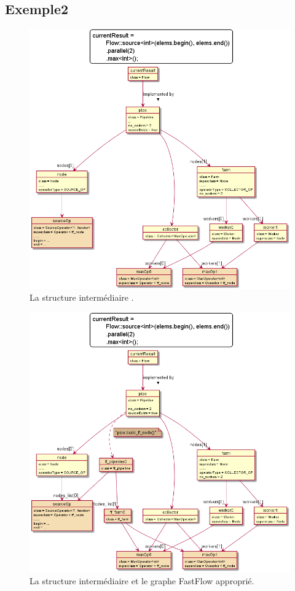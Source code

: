  
\subsection{Exemple2}

\begin{figure}
\centering
         \includegraphics[width=1.0\textwidth]{Figures/objets2-ppff.png}
      \caption{La structure interm\'ediaire .}
       \label{objets2-ppff.fig}
\end{figure}

\begin{figure}
\centering
         \includegraphics[width=1.0\textwidth]{Figures/objets2-ff.png}
      \caption{La structure interm\'ediaire  et le graphe FastFlow appropri\'e.}
       \label{objets2-ff.fig}
\end{figure}

